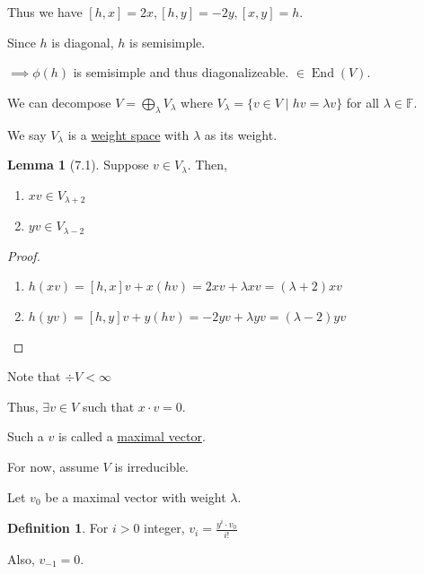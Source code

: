 \documentclass{article}
\theoremstyle{definition}
\newtheorem*{definition}{Definition}
\newtheorem{lemma}[theorem]{Lemma}
\newcommand{\End}{\operatorname{End}}
\begin{document}
Thus we have \([h,x] = 2x, [h,y]=-2y, [x,y]=h\). 

Since \(h\) is diagonal, \(h\) is semisimple.

\(\implies \phi(h)\) is semisimple and thus diagonalizeable. \(\in \End(V)\). 

We can decompose \(V = \bigoplus_{\lambda} V_\lambda\) where \(V_\lambda = \{ v\in V \mid h v = \lambda v \} \) for all \(\lambda \in \mathbb{F}\). 

We say \(V_\lambda\) is a \underline{weight space} with \(\lambda\) as its weight.

\begin{lemma}
    [7.1] Suppose \(v\in V_\lambda\). Then,

    \begin{enumerate}[label=\arabic*)]
        \item \(xv \in V_{\lambda+2}\)
        \item \(yv \in V_{\lambda-2}\) 
    \end{enumerate} 
\end{lemma}

\begin{proof}
    \begin{enumerate}[label=\arabic*)]
        \item \(h(xv) = [h,x]v + x(hv) = 2xv + \lambda xv = (\lambda + 2)xv\)
        \item \(h(yv) = [h,y]v + y(hv) = -2yv + \lambda yv = (\lambda - 2)yv\)  
    \end{enumerate} 
\end{proof}

\begin{center}
\end{center}

Note that \(\div V < \infty\)

Thus, \(\exists v \in V\) such that \(x\cdot v = 0\).

Such a \(v\) is called a \underline{maximal vector}. 

For now, assume \(V\) is irreducible.

Let \(v_0\) be a maximal vector with weight \(\lambda\).

\begin{definition}
    For \(i > 0\) integer, \(v_i = \frac{y^i\cdot v_0}{i!}\) 

    Also, \(v_{-1}=0\).
\end{definition}
\end{document}
